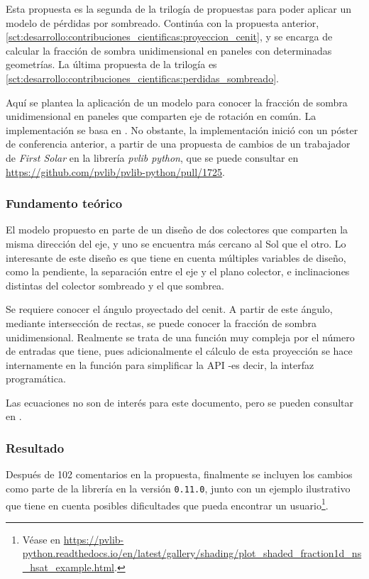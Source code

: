 Esta propuesta es la segunda de la trilogía de propuestas para poder aplicar un modelo de pérdidas por sombreado. Continúa con la propuesta anterior, \ref{sct:desarrollo:contribuciones_cientificas:proyeccion_cenit}, y se encarga de calcular la fracción de sombra unidimensional en paneles con determinadas geometrías. La última propuesta de la trilogía es \ref{sct:desarrollo:contribuciones_cientificas:perdidas_sombreado}.

Aquí se plantea la aplicación de un modelo para conocer la fracción de sombra unidimensional en paneles que comparten eje de rotación en común. La implementación se basa en \cite{Anderson_Jensen_2024}. No obstante, la implementación inició con un póster de conferencia anterior, a partir de una propuesta de cambios de un trabajador de \textit{First Solar} en la librería \textit{pvlib python}, que se puede consultar en \url{https://github.com/pvlib/pvlib-python/pull/1725}.

\subsubsection{Fundamento teórico}

El modelo propuesto en \cite{Anderson_Jensen_2024} parte de un diseño de dos colectores que comparten la misma dirección del eje, y uno se encuentra más cercano al Sol que el otro. Lo interesante de este diseño es que tiene en cuenta múltiples variables de diseño, como la pendiente, la separación entre el eje y el plano colector, e inclinaciones distintas del colector sombreado y el que sombrea.

Se requiere conocer el ángulo proyectado del cenit. A partir de este ángulo, mediante intersección de rectas, se puede conocer la fracción de sombra unidimensional. Realmente se trata de una función muy compleja por el número de entradas que tiene, pues adicionalmente el cálculo de esta proyección se hace internamente en la función para simplificar la API -es decir, la interfaz programática.

Las ecuaciones no son de interés para este documento, pero se pueden consultar en \cite{Anderson_Jensen_2024}.

\subsubsection{Resultado}

Después de 102 comentarios en la propuesta, finalmente se incluyen los cambios como parte de la librería en la versión \texttt{0.11.0}, junto con un ejemplo ilustrativo que tiene en cuenta posibles dificultades que pueda encontrar un usuario\footnote{Véase en \url{https://pvlib-python.readthedocs.io/en/latest/gallery/shading/plot_shaded_fraction1d_ns_hsat_example.html}.}.

